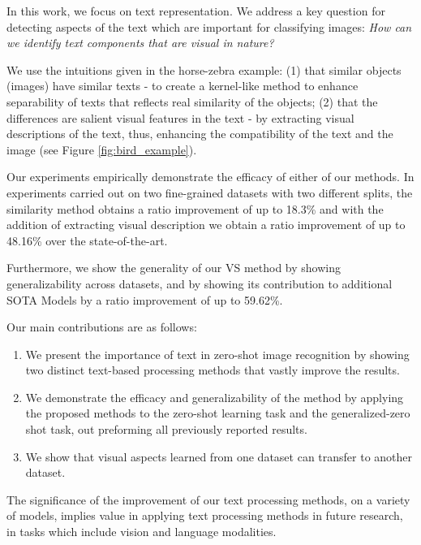 \documentclass[11pt,a4paper]{article}
\begin{document}
In this work, we focus on text representation. We address a key question for detecting aspects of the text which are important for classifying images: \textit {How can we identify text components that are visual in nature?}


We use the intuitions given in the horse-zebra example: (1) that similar objects (images) have similar texts - to create a kernel-like method to enhance separability of texts that reflects real similarity of the objects; (2) that the differences are salient visual features in the text - by extracting visual descriptions of the text, thus, enhancing the compatibility of the text and the image (see Figure \ref{fig:bird_example}).\par

\par


Our experiments empirically demonstrate the 
efficacy of either of our methods. 
In experiments carried out on two fine-grained datasets with two different splits, the similarity method obtains a ratio improvement of up to 18.3\% and with the addition of extracting visual description we obtain a ratio improvement of up to 48.16\% over the state-of-the-art.

Furthermore, we show the generality of our VS method by showing generalizability across datasets, and by showing its contribution to additional SOTA Models by a ratio improvement of up to 59.62\%.



Our main contributions are as follows:  
\begin{enumerate}
  \item We present the importance of text in zero-shot image recognition by showing two distinct text-based processing methods that vastly improve the results.
  
\item We demonstrate the efficacy and generalizability of the method by applying the proposed methods to the zero-shot learning task and the generalized-zero shot task, out preforming all previously reported results.
    
\item We show that visual aspects learned from one dataset can transfer to another dataset.  


\end{enumerate}

The significance of the improvement of our text processing methods, on a variety of models, implies value in applying text processing methods in future research, in tasks which include vision and language modalities.
\end{document}
